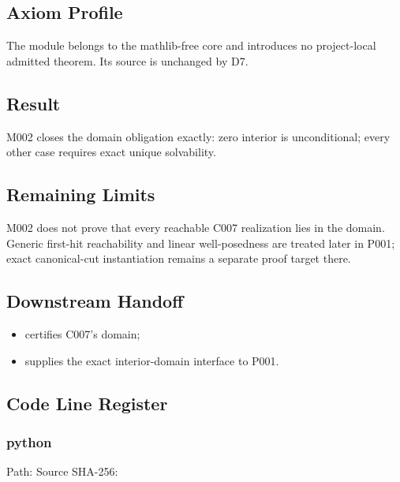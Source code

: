 \subsection{Axiom Profile}\label{axiom-profile-6}

The module belongs to the mathlib-free core and introduces no
project-local admitted theorem. Its source is unchanged by D7.

\subsection{Result}\label{result-19}

M002 closes the domain obligation exactly: zero interior is
unconditional; every other case requires exact unique solvability.

\subsection{Remaining Limits}\label{remaining-limits-6}

M002 does not prove that every reachable C007 realization lies in the
domain. Generic first-hit reachability and linear well-posedness are
treated later in P001; exact canonical-cut instantiation remains a
separate proof target there.

\subsection{Downstream Handoff}\label{downstream-handoff-19}

\begin{itemize}
\tightlist
\item
  \texttt{\protect{}} certifies C007's domain;
\item
  \texttt{\protect{}} supplies the exact interior-domain interface to P001.
\end{itemize}

\subsection{Code Line Register}\label{code-line-register-6}

\subsubsection{python}\label{python-6}

Path:
Source SHA-256:
\texttt{\protect{}}

